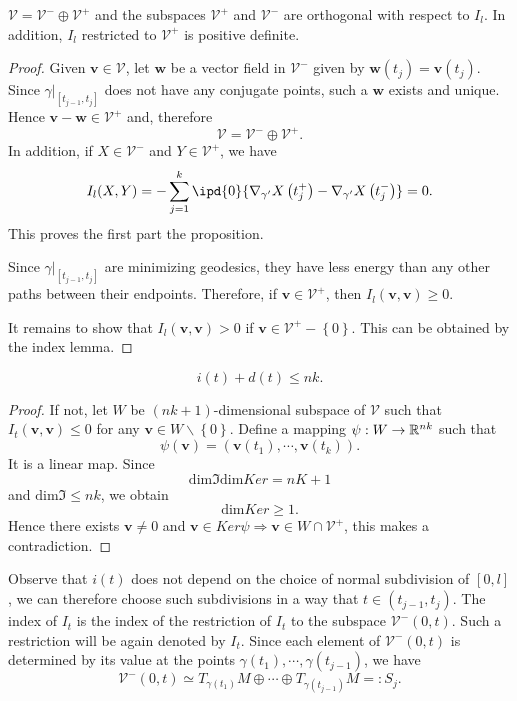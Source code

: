 \begin{proposition}
  $\mathcal{V}=\mathcal{V}^{-}\oplus \mathcal{V}^{+}$ and the subspaces $\mathcal{V}^{+}$ and $\mathcal{V}^{-}$ are orthogonal with respect to $I_l$. In addition, $I_l$ restricted to $\mathcal{V}^{+}$ is positive definite.
\end{proposition}

\begin{proof}
  Given $\mathbf{v}\in \mathcal{V}$, let $\mathbf{w}$ be a vector field in $\mathcal{V}^{-}$ given by $\mathbf{w}(t_j)=\mathbf{v}(t_j)$. Since $\gamma |_{\left[ t_{j-1},t_j \right] }$ does not have any conjugate points, such a $\mathbf{w}$ exists and unique. Hence $\mathbf{v}-\mathbf{w}\in \mathcal{V}^{+}$ and, therefore 
  \[
  \mathcal{V}=\mathcal{V}^{-}\oplus \mathcal{V}^{+}.
  \] 
  In addition, if $X\in \mathcal{V}^{-}$ and $Y\in \mathcal{V}^{+}$, we have
  \[
  I_l(X,Y)=-\sum_{j=1}^{k} \ipd{0}{ \nabla _{\gamma'}X\left( t_j^+ \right) -\nabla _{\gamma'}X\left( t_j^- \right) }=0.
\] This proves the first part the proposition.

Since $\gamma|_{\left[ t_{j-1},t_j \right] }$ are minimizing geodesics, they have less energy than any other paths between their endpoints. Therefore, if $\mathbf{v}\in \mathcal{V}^{+}$, then $I_l(\mathbf{v},\mathbf{v})\ge 0$.

It remains to show that $I_l(\mathbf{v},\mathbf{v})>0$ if $\mathbf{v}\in \mathcal{V}^{+}-\left\{0\right\} $. This can be obtained by the index lemma.
\end{proof}

\begin{lemma}
  \[
    i(t)+d(t)\le nk.
  \] 
  
\end{lemma}
\begin{proof}
  If not, let $W$ be $(nk+1)$-dimensional subspace of  $\mathcal{V}$ such that $I_t(\mathbf{v},\mathbf{v})\le 0$ for any $\mathbf{v}\in W\backslash \left\{0\right\} $. Define a mapping
  $\psi:W\to \mathbb{R}^{nk}$ such that 
  \[
    \psi(\mathbf{v})=\left( \mathbf{v}(t_1),\cdots ,\mathbf{v}(t_k) \right) .
  \] 
  It is a linear map. Since 
  \[
    \mathrm{dim}\Im \mathrm{dim}Ker=nK+1
  \] 
  and $\mathrm{dim}\Im\le nk$, we obtain 
  \[
  \mathrm{dim}Ker \ge 1.
  \] 
  Hence there exists $\mathbf{v}\neq 0 $ and $\mathbf{v}\in Ker\psi\Rightarrow \mathbf{v} \in W\cap \mathcal{V}^{+}$, this makes a contradiction.
\end{proof}

Observe that $i(t)$ does not depend on the choice of normal subdivision of $[0,l]$, we can therefore choose such subdivisions in a way that $t\in (t_{j-1},t_j)$. The index of $I_t$ is the index of the restriction of $I_t$ to the subspace $\mathcal{V}^{-}(0,t)$. Such a restriction will be again denoted by $I_t$. Since each element of $\mathcal{V}^{-}(0,t)$ is determined by its value at the points $\gamma(t_1),\cdots ,\gamma(t_{j-1})$, we have 
\[
  \mathcal{V}^{-}(0,t)\simeq T_{\gamma(t_1)}M\oplus\cdots \oplus T_{\gamma(t_{j-1})}M=:S_j.
\] 

